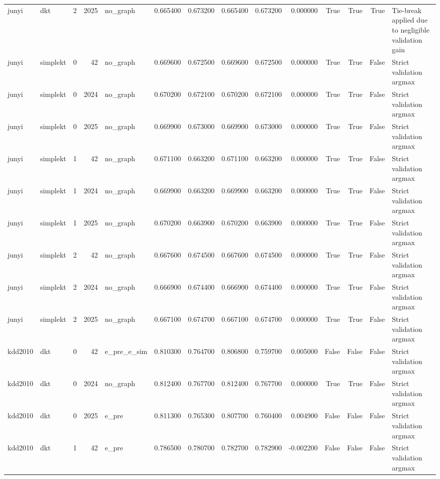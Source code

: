 \begin{tabular}{llrrlrrrrrrrrl}
junyi & dkt & 2 & 2025 & no_graph & 0.665400 & 0.673200 & 0.665400 & 0.673200 & 0.000000 & True & True & True & Tie-break applied due to negligible validation gain \\
junyi & simplekt & 0 & 42 & no_graph & 0.669600 & 0.672500 & 0.669600 & 0.672500 & 0.000000 & True & True & False & Strict validation argmax \\
junyi & simplekt & 0 & 2024 & no_graph & 0.670200 & 0.672100 & 0.670200 & 0.672100 & 0.000000 & True & True & False & Strict validation argmax \\
junyi & simplekt & 0 & 2025 & no_graph & 0.669900 & 0.673000 & 0.669900 & 0.673000 & 0.000000 & True & True & False & Strict validation argmax \\
junyi & simplekt & 1 & 42 & no_graph & 0.671100 & 0.663200 & 0.671100 & 0.663200 & 0.000000 & True & True & False & Strict validation argmax \\
junyi & simplekt & 1 & 2024 & no_graph & 0.669900 & 0.663200 & 0.669900 & 0.663200 & 0.000000 & True & True & False & Strict validation argmax \\
junyi & simplekt & 1 & 2025 & no_graph & 0.670200 & 0.663900 & 0.670200 & 0.663900 & 0.000000 & True & True & False & Strict validation argmax \\
junyi & simplekt & 2 & 42 & no_graph & 0.667600 & 0.674500 & 0.667600 & 0.674500 & 0.000000 & True & True & False & Strict validation argmax \\
junyi & simplekt & 2 & 2024 & no_graph & 0.666900 & 0.674400 & 0.666900 & 0.674400 & 0.000000 & True & True & False & Strict validation argmax \\
junyi & simplekt & 2 & 2025 & no_graph & 0.667100 & 0.674700 & 0.667100 & 0.674700 & 0.000000 & True & True & False & Strict validation argmax \\
kdd2010 & dkt & 0 & 42 & e_pre_e_sim & 0.810300 & 0.764700 & 0.806800 & 0.759700 & 0.005000 & False & False & False & Strict validation argmax \\
kdd2010 & dkt & 0 & 2024 & no_graph & 0.812400 & 0.767700 & 0.812400 & 0.767700 & 0.000000 & True & True & False & Strict validation argmax \\
kdd2010 & dkt & 0 & 2025 & e_pre & 0.811300 & 0.765300 & 0.807700 & 0.760400 & 0.004900 & False & False & False & Strict validation argmax \\
kdd2010 & dkt & 1 & 42 & e_pre & 0.786500 & 0.780700 & 0.782700 & 0.782900 & -0.002200 & False & False & False & Strict validation argmax \\

\end{tabular}

